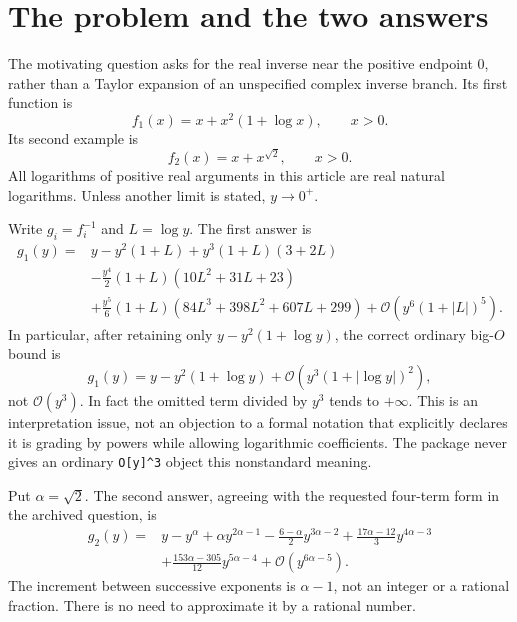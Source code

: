 \documentclass[11pt,a4paper]{article}
\numberwithin{equation}{section}
\theoremstyle{definition}\newtheorem{definition}[theorem]{Definition}
\theoremstyle{remark}\newtheorem{remark}[theorem]{Remark}
\newcommand{\OO}{\mathcal O}\newcommand{\dd}{\mathrm d}
\newcommand{\code}[1]{\texttt{#1}}
\begin{document}
\section{The problem and the two answers}
\label{sec:answers}

The motivating question \cite{question} asks for the real inverse near the
positive endpoint $0$, rather than a Taylor expansion of an unspecified
complex inverse branch. Its first function is
\begin{equation}
 f_1(x)=x+x^2(1+\log x),\qquad x>0.
 \label{eq:f1}
\end{equation}
Its second example is
\begin{equation}
 f_2(x)=x+x^{\sqrt2},\qquad x>0.
 \label{eq:f2}
\end{equation}
All logarithms of positive real arguments in this article are real natural
logarithms. Unless another limit is stated, $y\to0^+$.

Write $g_i=f_i^{-1}$ and $L=\log y$. The first answer is
\begin{align}
 g_1(y)={}&y-y^2(1+L)+y^3(1+L)(3+2L)\nonumber\\
 &-\frac{y^4}{2}(1+L)(10L^2+31L+23)\nonumber\\
 &+\frac{y^5}{6}(1+L)(84L^3+398L^2+607L+299)
 +\OO\!\left(y^6(1+|L|)^5\right).
 \label{eq:first-answer}
\end{align}
In particular, after retaining only $y-y^2(1+\log y)$, the correct
ordinary big-$O$ bound is
\begin{equation}
 g_1(y)=y-y^2(1+\log y)
       +\OO\!\left(y^3(1+|\log y|)^2\right),
 \label{eq:log-remainder}
\end{equation}
not $\OO(y^3)$. In fact the omitted term divided by $y^3$ tends to
$+\infty$. This is an interpretation issue, not an objection to a formal
notation that explicitly declares it is grading by powers while allowing
logarithmic coefficients. The package never gives an ordinary
\code{O[y]\^{}3} object this nonstandard meaning.

Put $\alpha=\sqrt2$. The second answer, agreeing with the requested
four-term form in the archived question, is
\begin{align}
 g_2(y)={}&y-y^\alpha+\alpha y^{2\alpha-1}
 -\frac{6-\alpha}{2}y^{3\alpha-2}
 +\frac{17\alpha-12}{3}y^{4\alpha-3}\nonumber\\
 &+\frac{153\alpha-305}{12}y^{5\alpha-4}
 +\OO\!\left(y^{6\alpha-5}\right).
 \label{eq:second-answer}
\end{align}
The increment between successive exponents is $\alpha-1$, not an integer
or a rational fraction. There is no need to approximate it by a rational
number.
\end{document}
